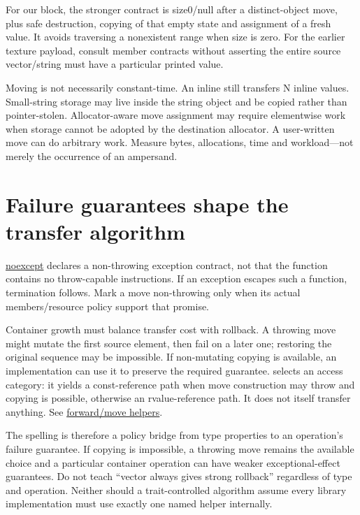 For our block, the stronger contract is size0/null after a distinct-object move, plus safe destruction, copying of that empty state and assignment of a fresh value. It avoids traversing a nonexistent range when size is zero. For the earlier texture payload, consult member contracts without asserting the entire source vector/string must have a particular printed value.

Moving is not necessarily constant-time. An inline  still transfers N inline values. Small-string storage may live inside the string object and be copied rather than pointer-stolen. Allocator-aware move assignment may require elementwise work when storage cannot be adopted by the destination allocator. A user-written move can do arbitrary work. Measure bytes, allocations, time and workload---not merely the occurrence of an ampersand.

\section{Failure guarantees shape the transfer algorithm}\label{01-foundations-i-ch003-failure-guarantees-shape-the-transfer-algorithm}

\hypertarget{01-foundations-i-ch003-failure-guarantees-shape-the-transfer-algorithm}{}

\hyperref[appendix-c746afaa47d1]{noexcept} declares a non-throwing exception contract, not that the function contains no throw-capable instructions. If an exception escapes such a function, termination follows. Mark a move non-throwing only when its actual members/resource policy support that promise.

Container growth must balance transfer cost with rollback. A throwing move might mutate the first source element, then fail on a later one; restoring the original sequence may be impossible. If non-mutating copying is available, an implementation can use it to preserve the required guarantee.  selects an access category: it yields a const-reference path when move construction may throw and copying is possible, otherwise an rvalue-reference path. It does not itself transfer anything. See \href{https://eel.is/c++draft/forward}{forward/move helpers}.

The spelling is therefore a policy bridge from type properties to an operation's failure guarantee. If copying is impossible, a throwing move remains the available choice and a particular container operation can have weaker exceptional-effect guarantees. Do not teach ``vector always gives strong rollback'' regardless of type and operation. Neither should a trait-controlled algorithm assume every library implementation must use exactly one named helper internally.

